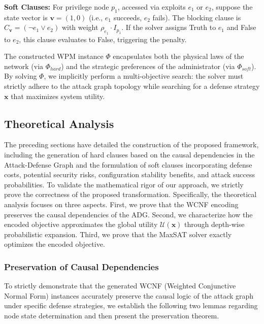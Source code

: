 \documentclass[conference]{IEEEtran}
\theoremstyle{definition} %
\theoremstyle{plain} %
\begin{document}
\textbf{Soft Clauses:} For privilege node $p_1$, accessed via exploits $e_1$ or $e_2$, suppose the state vector is $\mathbf{v}=(1,0)$ (i.e., $e_1$ succeeds, $e_2$ fails). The blocking clause is $C_{\mathbf{v}} = (\neg e_1 \vee e_2)$ with weight $\rho_{e_1} \cdot I_{p_1}$. If the solver assigns Truth to $e_1$ and False to $e_2$, this clause evaluates to False, triggering the penalty.

The constructed WPM instance $\Phi$ encapsulates both the physical laws of the network (via $\Phi_{hard}$) and the strategic preferences of the administrator (via $\Phi_{soft}$). By solving $\Phi$, we implicitly perform a multi-objective search: the solver must strictly adhere to the attack graph topology while searching for a defense strategy $\mathbf{x}$ that  maximizes system utility.

\subsection{Theoretical Analysis}

The preceding sections have detailed the construction of the proposed framework, including the generation of hard clauses based on the causal dependencies in the Attack-Defense Graph and the formulation of soft clauses incorporating defense costs, potential security risks, configuration stability benefits, and attack success probabilities. 
To validate the mathematical rigor of our approach, we strictly prove the correctness of the proposed transformation. Specifically, the theoretical analysis focuses on three aspects. First, we prove that the WCNF encoding preserves the causal dependencies of the ADG. Second, we characterize how the encoded objective approximates the global utility $\mathcal{U}(\mathbf{x})$ through depth-wise probabilistic expansion. Third, we prove that the MaxSAT solver exactly optimizes the encoded objective.

\subsubsection{Preservation of Causal Dependencies}

To strictly demonstrate that the generated WCNF (Weighted Conjunctive Normal Form) instances accurately preserve the causal logic of the attack graph under specific defense strategies, we establish the following two lemmas regarding node state determination and then present the preservation theorem.
\end{document}
